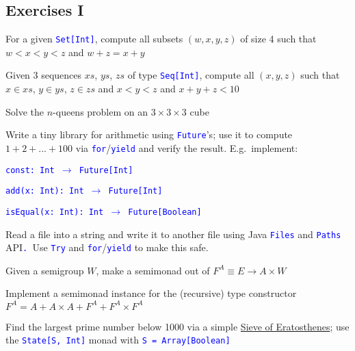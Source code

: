 \subsection{Exercises I}

For a given \texttt{\textcolor{blue}{\footnotesize{}Set{[}Int{]}}},
compute all subsets $\left(w,x,y,z\right)$ of size 4 such that $w<x<y<z$
and $w+z=x+y$

Given 3 sequences $xs$, $ys$, $zs$ of type \texttt{\textcolor{blue}{\footnotesize{}Seq{[}Int{]}}},
compute all $\left(x,y,z\right)$ such that $x\in xs$, $y\in ys$,
$z\in zs$ and $x<y<z$ and $x+y+z<10$

Solve the $n$-queens problem on an $3\times3\times3$ cube

Write a tiny library for arithmetic using \texttt{\textcolor{blue}{\footnotesize{}Future}}'s;
use it to compute $1+2+...+100$ via \texttt{\textcolor{blue}{\footnotesize{}for}}/\texttt{\textcolor{blue}{\footnotesize{}yield}}
and verify the result. E.g.\ implement: 

\texttt{\textcolor{blue}{\footnotesize{}const: Int $\rightarrow$
Future{[}Int{]}}}{\footnotesize\par}

\texttt{\textcolor{blue}{\footnotesize{}add(x: Int): Int $\rightarrow$
Future{[}Int{]}}}{\footnotesize\par}

\texttt{\textcolor{blue}{\footnotesize{}isEqual(x: Int): Int $\rightarrow$
Future{[}Boolean{]} }}{\footnotesize\par}

Read a file into a string and write it to another file using Java
\texttt{\textcolor{blue}{\footnotesize{}Files}} and \texttt{\textcolor{blue}{\footnotesize{}Paths}}
API\texttt{\textcolor{blue}{\footnotesize{}. }}Use \texttt{\textcolor{blue}{\footnotesize{}Try}}
and \texttt{\textcolor{blue}{\footnotesize{}for}}/\texttt{\textcolor{blue}{\footnotesize{}yield}}
to make this safe.

Given a semigroup $W$, make a semimonad out of $F^{A}\equiv E\rightarrow A\times W$ 

Implement a semimonad instance for the (recursive) type constructor
$F^{A}=A+A\times A+F^{A}+F^{A}\times F^{A}$

Find the largest prime number below 1000 via a simple \href{https://en.wikipedia.org/wiki/Sieve_of_Eratosthenes}{Sieve of Eratosthenes};
use the \texttt{\textcolor{blue}{\footnotesize{}State{[}S, Int{]}}}
monad with \texttt{\textcolor{blue}{\footnotesize{}S = Array{[}Boolean{]}}} 

